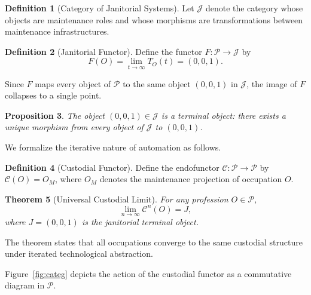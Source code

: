\documentclass[12pt,a4paper]{article}
\theoremstyle{plain}
\newtheorem{theorem}{Theorem}[section]
\newtheorem{proposition}[theorem]{Proposition}
\theoremstyle{definition}
\newtheorem{definition}[theorem]{Definition}
\theoremstyle{remark}
\begin{document}
\begin{definition}[Category of Janitorial Systems]
Let $\mathcal{J}$ denote the category whose objects are maintenance roles and
whose morphisms are transformations between maintenance infrastructures.
\end{definition}

\begin{definition}[Janitorial Functor]
Define the functor $F : \mathcal{P} \to \mathcal{J}$ by
\[
F(O) = \lim_{t\to\infty} T_O(t) = (0,0,1).
\]
\end{definition}

Since $F$ maps every object of $\mathcal{P}$ to the same object $(0,0,1)$ in
$\mathcal{J}$, the image of $F$ collapses to a single point.

\begin{proposition}
The object $(0,0,1) \in \mathcal{J}$ is a terminal object: there exists a
unique morphism from every object of $\mathcal{J}$ to $(0,0,1)$.
\end{proposition}

We formalize the iterative nature of automation as follows.

\begin{definition}[Custodial Functor]
Define the endofunctor $\mathcal{C} : \mathcal{P} \to \mathcal{P}$ by
$\mathcal{C}(O) = O_M$, where $O_M$ denotes the maintenance projection of
occupation $O$.
\end{definition}

\begin{theorem}[Universal Custodial Limit]
\label{thm:custodial}
For any profession $O \in \mathcal{P}$,
\[
\lim_{n\to\infty} \mathcal{C}^n(O) = J,
\]
where $J = (0,0,1)$ is the janitorial terminal object.
\end{theorem}

The theorem states that all occupations converge to the same custodial
structure under iterated technological abstraction.

Figure~\ref{fig:categ} depicts the action of the custodial functor as a
commutative diagram in $\mathcal{P}$.
\end{document}
